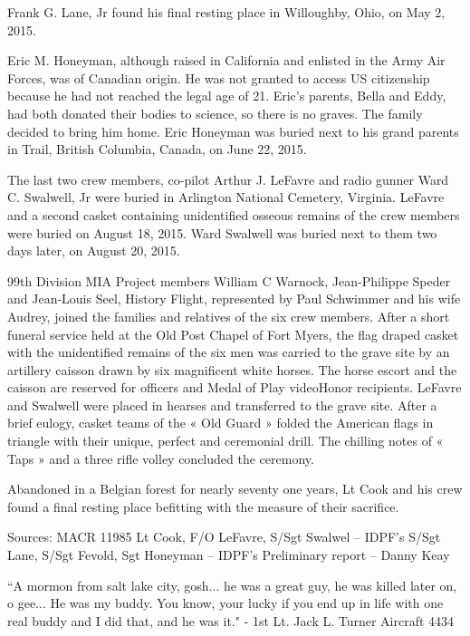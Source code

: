\documentclass{article}
\begin{document}
\begin{multicols}{3}
Frank G. Lane, Jr found his final resting place in Willoughby, Ohio, on May 2, 2015.

Eric M. Honeyman, although raised in California and enlisted in the Army Air Forces, was of Canadian origin. He was not granted to access US citizenship because he had not reached the legal age of 21. Eric’s parents, Bella and Eddy, had both donated their bodies to science, so there is no graves. The family decided to bring him home. Eric Honeyman was buried next to his grand parents in Trail, British Columbia, Canada, on June 22, 2015.

The last two crew members, co-pilot Arthur J. LeFavre and radio gunner Ward C. Swalwell, Jr were buried in Arlington National Cemetery, Virginia. LeFavre and a second casket containing unidentified osseous remains of the crew members were buried on August 18, 2015.  Ward Swalwell was buried next to them two days later, on August 20, 2015.

99th Division MIA Project members William C Warnock, Jean-Philippe Speder and Jean-Louis Seel,  History Flight, represented by Paul Schwimmer and his wife Audrey, joined the families and relatives of the six crew members. After a short funeral service held at the Old Post Chapel of Fort Myers, the flag draped casket with the unidentified remains of the six men was carried to the grave site by an artillery caisson drawn by six magnificent white horses. The horse escort and the caisson are reserved for officers and Medal of Play videoHonor recipients. LeFavre and Swalwell were placed in hearses and transferred to the grave site. After a brief eulogy, casket teams of the « Old Guard » folded the American flags in triangle with their unique, perfect and ceremonial drill. The chilling notes of « Taps » and a three rifle volley concluded the ceremony.

Abandoned in a Belgian forest for nearly seventy one years, Lt Cook and his crew found a final resting place befitting with the measure of their sacrifice.

Sources:
MACR 11985
Lt Cook, F/O LeFavre, S/Sgt Swalwel – IDPF’s
S/Sgt Lane, S/Sgt Fevold, Sgt Honeyman – IDPF’s
Preliminary report – Danny Keay



``A mormon from salt lake city, gosh... he was a great guy, 
he was killed later on, o gee... He was my buddy. You know, 
your lucky if you end up in life with one real buddy and I 
did that, and he was it." - 1st Lt. Jack L. Turner
Aircraft 4434


\end{multicols}
\end{document}
